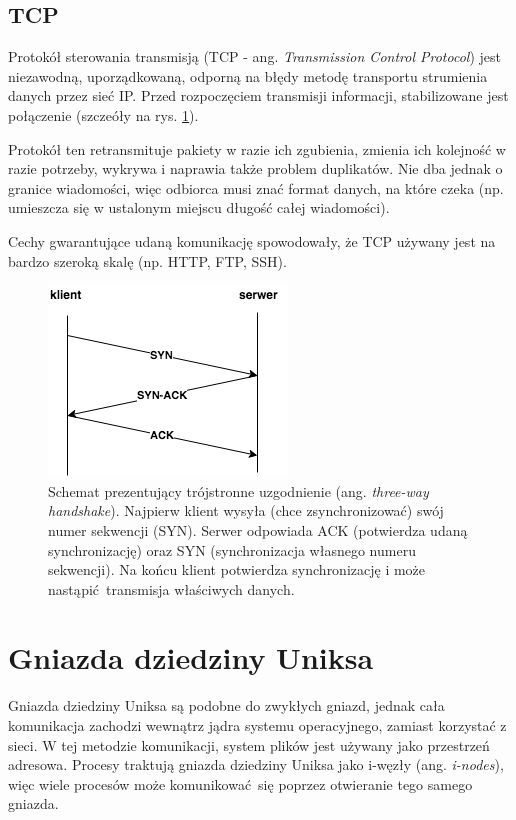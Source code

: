 \subsection{TCP}

Protokół sterowania transmisją (TCP - ang. \textit{Transmission Control Protocol}) jest niezawodną, uporządkowaną, odporną na błędy metodę transportu strumienia danych przez sieć IP. Przed rozpoczęciem transmisji informacji, stabilizowane jest połączenie (szczeóły na rys. \ref{fig:TCP_handshake}).

Protokół ten retransmituje pakiety w razie ich zgubienia, zmienia ich kolejność w razie potrzeby, wykrywa i naprawia także problem duplikatów. Nie dba jednak o granice wiadomości, więc odbiorca musi znać format danych, na które czeka (np. umieszcza się w ustalonym miejscu długość całej wiadomości).

Cechy gwarantujące udaną komunikację spowodowały, że TCP używany jest na bardzo szeroką skalę (np. HTTP, FTP, SSH).

\begin{figure}[h]
	\centering
	\includegraphics{img/TCP_handshake.png}
	\caption{Schemat prezentujący trójstronne uzgodnienie (ang. \textit{three-way handshake}). Najpierw klient wysyła (chce zsynchronizować) swój numer sekwencji (SYN). Serwer odpowiada ACK (potwierdza udaną synchronizację) oraz SYN (synchronizacja własnego numeru sekwencji). Na końcu klient potwierdza synchronizację i może nastąpić transmisja właściwych danych.}
	\label{fig:TCP_handshake}
\end{figure}
%


\section{Gniazda dziedziny Uniksa}

Gniazda dziedziny Uniksa są podobne do zwykłych gniazd, jednak cała komunikacja zachodzi wewnątrz jądra systemu operacyjnego, zamiast korzystać z sieci. W tej metodzie komunikacji, system plików jest używany jako przestrzeń adresowa. Procesy traktują gniazda dziedziny Uniksa jako i-węzły (ang. \textit{i-nodes}), więc wiele procesów może komunikować się poprzez otwieranie tego samego gniazda.


